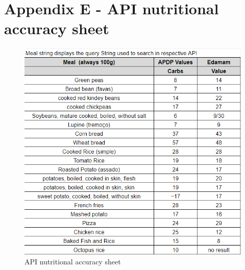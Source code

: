 \appendix


\begin{landscape}
    \appendix
    
\end{landscape}

\appendix
\section*{Appendix E - API nutritional accuracy sheet}
\begin{figure}[H] 
    \begin{center}
        \includegraphics[scale=1]{_figures/api_nutritional_accuracy.png}
        \caption{API nutritional accuracy sheet}
    \end{center}       
\end{figure}

